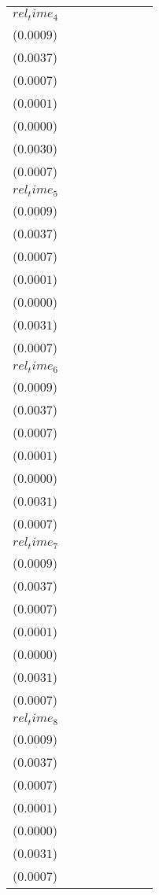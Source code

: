\begin{tabular}{llllllll}
$rel_time_4$ & \makecell{$0.0026^{***}$ \\ ($0.0009$)} & \makecell{$0.0114^{***}$ \\ ($0.0037$)} & \makecell{$-0.0007^{}$ \\ ($0.0007$)} & \makecell{$-0.0000^{}$ \\ ($0.0001$)} & \makecell{$-0.0001^{**}$ \\ ($0.0000$)} & \makecell{$0.0101^{***}$ \\ ($0.0030$)} & \makecell{$0.0023^{***}$ \\ ($0.0007$)} \\
$rel_time_5$ & \makecell{$0.0030^{***}$ \\ ($0.0009$)} & \makecell{$0.0131^{***}$ \\ ($0.0037$)} & \makecell{$-0.0007^{}$ \\ ($0.0007$)} & \makecell{$-0.0000^{}$ \\ ($0.0001$)} & \makecell{$-0.0001^{***}$ \\ ($0.0000$)} & \makecell{$0.0106^{***}$ \\ ($0.0031$)} & \makecell{$0.0023^{***}$ \\ ($0.0007$)} \\
$rel_time_6$ & \makecell{$0.0039^{***}$ \\ ($0.0009$)} & \makecell{$0.0180^{***}$ \\ ($0.0037$)} & \makecell{$-0.0024^{***}$ \\ ($0.0007$)} & \makecell{$-0.0002^{**}$ \\ ($0.0001$)} & \makecell{$-0.0001^{***}$ \\ ($0.0000$)} & \makecell{$0.0139^{***}$ \\ ($0.0031$)} & \makecell{$0.0027^{***}$ \\ ($0.0007$)} \\
$rel_time_7$ & \makecell{$0.0034^{***}$ \\ ($0.0009$)} & \makecell{$0.0145^{***}$ \\ ($0.0037$)} & \makecell{$-0.0026^{***}$ \\ ($0.0007$)} & \makecell{$-0.0001^{*}$ \\ ($0.0001$)} & \makecell{$-0.0001^{***}$ \\ ($0.0000$)} & \makecell{$0.0120^{***}$ \\ ($0.0031$)} & \makecell{$0.0025^{***}$ \\ ($0.0007$)} \\
$rel_time_8$ & \makecell{$0.0040^{***}$ \\ ($0.0009$)} & \makecell{$0.0146^{***}$ \\ ($0.0037$)} & \makecell{$-0.0008^{}$ \\ ($0.0007$)} & \makecell{$-0.0000^{}$ \\ ($0.0001$)} & \makecell{$-0.0000^{}$ \\ ($0.0000$)} & \makecell{$0.0123^{***}$ \\ ($0.0031$)} & \makecell{$0.0031^{***}$ \\ ($0.0007$)} \\

\end{tabular}
